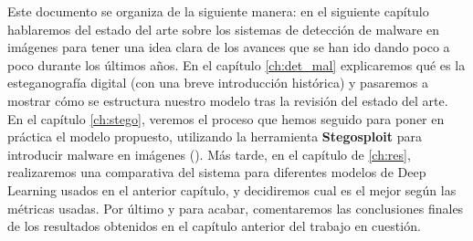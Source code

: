 Este documento se organiza de la siguiente manera: en el siguiente capítulo hablaremos del estado del arte sobre los sistemas de detección de malware en imágenes para tener una idea clara de los avances que se han ido dando poco a poco durante los últimos años. En el capítulo \ref{ch:det_mal} explicaremos qué es la esteganografía digital (con una breve introducción histórica) y pasaremos a mostrar cómo se estructura nuestro modelo tras la revisión del estado del arte. En el capítulo \ref{ch:stego}, veremos el proceso que hemos seguido para poner en práctica el modelo propuesto, utilizando la herramienta \textbf{Stegosploit} para introducir malware en imágenes (\cite{stegosploit}). Más tarde, en el capítulo de \ref{ch:res}, realizaremos una comparativa del sistema para diferentes modelos de Deep Learning usados en el anterior capítulo, y decidiremos cual es el mejor según las métricas usadas. Por último y para acabar, comentaremos las conclusiones finales de los resultados obtenidos en el capítulo anterior del trabajo en cuestión. %